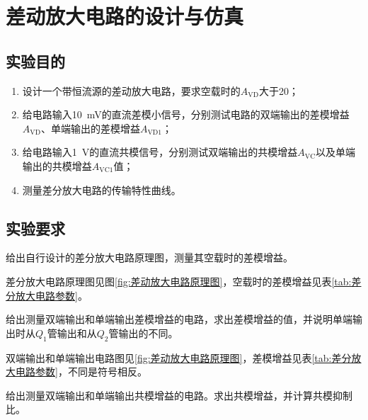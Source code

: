 \chapter{差动放大电路的设计与仿真}%
\label{cha:差动放大电路的设计与仿真}

\section{实验目的}%
\label{sec:\arabic{chapter}实验目的}

\begin{enumerate}
	\item 设计一个带恒流源的差动放大电路，要求空载时的$ A_\mathrm{VD} $大于20；
	\item 给电路输入\SI{10}{\mV}的直流差模小信号，分别测试电路的双端输出的差模增益$ A_\mathrm{VD} $、单端输出的差模增益$ A_\mathrm{VD1} $；
	\item 给电路输入\SI{1}{\V}的直流共模信号，分别测试双端输出的共模增益$ A_\mathrm{VC} $以及单端输出的共模增益$ A_\mathrm{VC1} $值；
	\item 测量差分放大电路的传输特性曲线。
\end{enumerate}

\section{实验要求}%
\label{sec:\arabic{chapter}实验要求}

\begin{Exercise}
	给出自行设计的差分放大电路原理图，测量其空载时的差模增益。
\end{Exercise}

\begin{Answer}
	差分放大电路原理图见图\ref{fig:差动放大电路原理图}，空载时的差模增益见表\ref{tab:差分放大电路参数}。
\end{Answer}

\begin{Exercise}
	给出测量双端输出和单端输出差模增益的电路，求出差模增益的值，并说明单端输出时从$ Q_1 $管输出和从$ Q_2 $管输出的不同。
\end{Exercise}

\begin{Answer}
	双端输出和单端输出电路图见\ref{fig:差动放大电路原理图}，差模增益见表\ref{tab:差分放大电路参数}，不同是符号相反。
\end{Answer}

\begin{Exercise}
	给出测量双端输出和单端输出共模增益的电路。求出共模增益，并计算共模抑制比。
\end{Exercise}

